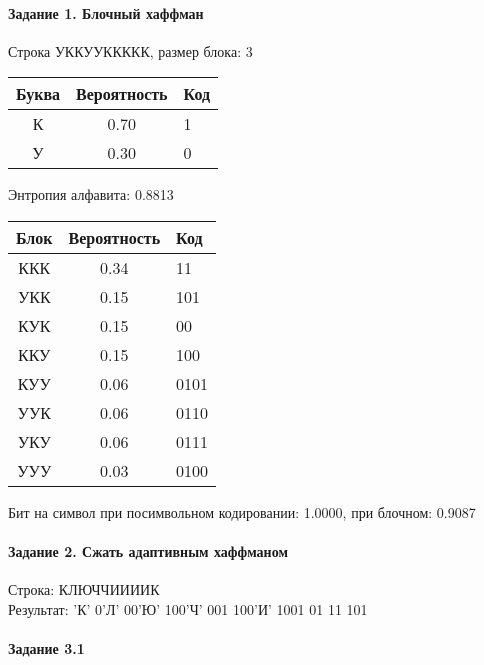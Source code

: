 \documentclass[a4paper, 12pt]{article}
\begin{document}
\paragraph{Задание 1. Блочный хаффман \\}

Строка УККУУККККК, размер блока: 3
\begin{center}
 \begin{tabular}{ |c|c|l| } 
  \hline
     Буква & Вероятность & Код\\ \hline
К & 0.70 & 1\\\hline
У & 0.30 & 0
\\ \hline \end{tabular}
\end{center}
Энтропия алфавита: 0.8813
\begin{center}
 \begin{tabular}{ |c|c|l| } 
  \hline
     Блок & Вероятность & Код\\ \hline
ККК & 0.34 & 11\\\hline
УКК & 0.15 & 101\\\hline
КУК & 0.15 & 00\\\hline
ККУ & 0.15 & 100\\\hline
КУУ & 0.06 & 0101\\\hline
УУК & 0.06 & 0110\\\hline
УКУ & 0.06 & 0111\\\hline
УУУ & 0.03 & 0100
\\ \hline \end{tabular}
\end{center}
Бит на символ при посимвольном кодировании: 1.0000, при блочном: 0.9087


\pagebreak
\paragraph{Задание 2. Сжать адаптивным хаффманом\\}

Строка: 
КЛЮЧЧИИИИК\\
Результат: 'К' 0'Л' 00'Ю' 100'Ч' 001 100'И' 1001 01 11 101










\pagebreak
\paragraph{Задание 3.1}
\end{document}
